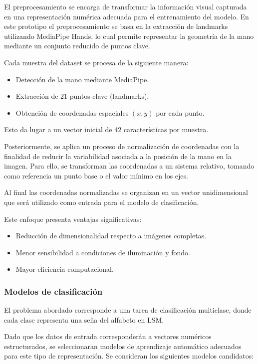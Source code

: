 	El preprocesamiento se encarga de transformar la información visual capturada en una representación numérica adecuada para el entrenamiento del modelo. En este prototipo el preprocesamiento se basa en la extracción de landmarks utilizando MediaPipe Hands, lo cual permite representar la geometría de la mano mediante un conjunto reducido de puntos clave.
	
	Cada muestra del dataset se procesa de la siguiente manera:
	
	\begin{itemize}
		\item Detección de la mano mediante MediaPipe.
		\item Extracción de 21 puntos clave (landmarks).
		\item Obtención de coordenadas espaciales $(x, y)$ por cada punto.
	\end{itemize}
	
	Esto da lugar a un vector inicial de 42 características por muestra.
	
	Posteriormente, se aplica un proceso de normalización de coordenadas con la finalidad de reducir la variabilidad asociada a la posición de la mano en la imagen. Para ello, se transforman las coordenadas a un sistema relativo, tomando como referencia un punto base o el valor mínimo en los ejes.
	
	Al final las coordenadas normalizadas se organizan en un vector unidimensional que será utilizado como entrada para el modelo de clasificación.
	
	Este enfoque presenta ventajas significativas:
	\begin{itemize}
		\item Reducción de dimensionalidad respecto a imágenes completas.
		\item Menor sensibilidad a condiciones de iluminación y fondo.
		\item Mayor eficiencia computacional.
	\end{itemize}
	
	\subsubsection{Modelos de clasificación}
	
	El problema abordado corresponde a una tarea de clasificación multiclase,
	 donde cada clase representa una seña del alfabeto en LSM.
	
	Dado que los datos de entrada corresponderán a vectores numéricos estructurados, se seleccionaran modelos de aprendizaje automático adecuados para este tipo de representación. Se consideran los siguientes modelos candidatos:
	
